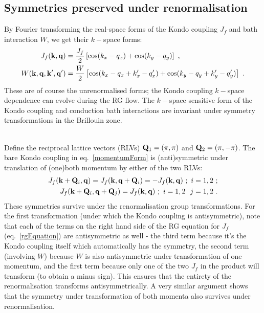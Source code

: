 \documentclass[%
reprint,
superscriptaddress,
groupedaddress,
superscriptaddress,
onecolumn,
]{revtex4-2}
\begin{document}
\subsection{Symmetries preserved under renormalisation}
By Fourier transforming the real-space forms of the Kondo coupling \(J_f\) and bath interaction \(W\), we get their \(k-\)space forms:
\begin{equation}\begin{aligned}\label{momentumForm}
	J_f({\bf k}, {\bf q}) &= \frac{J_f}{2}\left[\cos(k_x - q_x) + \cos(k_y - q_y)\right]~,\\
	W({\bf k}, {\bf q}, {\bf k}^\prime, {\bf q}^\prime) &= \frac{W}{2}\left[\cos(k_x - q_x + k^\prime_x - q^\prime_x) + \cos(k_y - q_y + k^\prime_y - q^\prime_y)\right]~.
\end{aligned}\end{equation}
These are of course the unrenormalised forms; the Kondo coupling \(k-\)space dependence can evolve during the RG flow. The \(k-\)space sensitive form of the Kondo coupling and conduction bath interactions are invariant under symmetry transformations in the Brillouin zone.\\

\par{}\\
Define the reciprocal lattice vectors (RLVs) \({\bf Q}_1 = \left(\pi, \pi\right)\) and \({\bf Q}_2 = \left(\pi, -\pi\right)\). The bare Kondo coupling in eq.~\ref{momentumForm} is (anti)symmetric under translation of (one)both momentum by either of the two RLVs:
\begin{equation}\begin{aligned}\label{oppositeQ}
	J_f({\bf k} + {\bf Q}_i, {\bf q}) = J_f({\bf k}, {\bf q} + {\bf Q}_i) = - J_f({\bf k}, {\bf q})~;~i = 1,2~;\\
	J_f({\bf k} + {\bf Q}_i, {\bf q} + {\bf Q}_j) = J_f({\bf k}, {\bf q})~;~i=1,2~~j=1,2~.\\
\end{aligned}\end{equation}
These symmetries survive under the renormalisation group transformations. For the first transformation (under which the Kondo coupling is antisymmetric), note that each of the terms on the right hand side of the RG equation for \(J_f\) (eq.~\ref{rgEquation}) are antisymmetric as well - the third term because it's the Kondo coupling itself which automatically has the symmetry, the second term (involving \(W\)) because \(W\) is also antisymmetric under transformation of one momentum, and the first term because only one of the two \(J_f\) in the product will transform (to obtain a minus sign). This ensures that the entirety of the renormalisation transforms antisymmetrically. A very similar argument shows that the symmetry under transformation of both momenta also survives under renormalisation.\\
\end{document}
